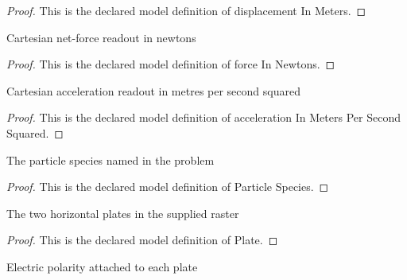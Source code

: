 \begin{proof}
  This is the declared model definition of displacement In Meters.
\end{proof}
\begin{definition}
  \label{def:physics:phyx-mini-0837:phyxminiproblems-problemphyxmini0837-forceinnewtons}
  Cartesian net-force readout in newtons
\end{definition}
\begin{proof}
  This is the declared model definition of force In Newtons.
\end{proof}
\begin{definition}
  \label{def:physics:phyx-mini-0837:phyxminiproblems-problemphyxmini0837-accelerationinmeterspersecondsquared}
  Cartesian acceleration readout in metres per second squared
\end{definition}
\begin{proof}
  This is the declared model definition of acceleration In Meters Per Second Squared.
\end{proof}
\begin{definition}
  \label{def:physics:phyx-mini-0837:phyxminiproblems-problemphyxmini0837-particlespecies}
  The particle species named in the problem
\end{definition}
\begin{proof}
  This is the declared model definition of Particle Species.
\end{proof}
\begin{definition}[Plate]
  \label{def:physics:phyx-mini-0837:phyxminiproblems-problemphyxmini0837-plate}
  The two horizontal plates in the supplied raster
\end{definition}
\begin{proof}
  This is the declared model definition of Plate.
\end{proof}
\begin{definition}
  \label{def:physics:phyx-mini-0837:phyxminiproblems-problemphyxmini0837-platepolarity}
  Electric polarity attached to each plate
\end{definition}
